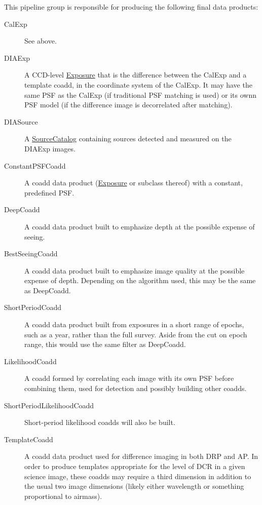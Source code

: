 This pipeline group is responsible for producing the following final data products:
\begin{description}
\item[CalExp]  See above.
\item[DIAExp] A CCD-level \hyperref[sec:spImagesExposure]{Exposure} that is the difference between the CalExp and a template coadd, in the coordinate system of the CalExp.  It may have the same PSF as the CalExp (if traditional PSF matching is used) or its ownn PSF model (if the difference image is decorrelated after matching).
\item[DIASource] A \hyperref[sec:spTablesSource]{SourceCatalog} containing sources detected and measured on the DIAExp images.
\item[ConstantPSFCoadd] A coadd data product (\hyperref[sec:spImagesExposure]{Exposure} or subclass thereof) with a constant, predefined PSF.
\item[DeepCoadd] A coadd data product built to emphasize depth at the possible expense of seeing.
\item[BestSeeingCoadd] A coadd data product built to emphasize image quality at the possible expense of depth.  Depending on the algorithm used, this may be the same as DeepCoadd.
\item[ShortPeriodCoadd] A coadd data product built from exposures in a short range of epochs, such as a year, rather than the full survey.  Aside from the cut on epoch range, this would use the same filter as DeepCoadd.
\item[LikelihoodCoadd] A coadd formed by correlating each image with its own PSF before combining them, used for detection and possibly building other coadds.
\item[ShortPeriodLikelihoodCoadd] Short-period likelihood coadds will also be built.
\item[TemplateCoadd] A coadd data product used for difference imaging in both DRP and AP.  In order to produce templates appropriate for the level of DCR in a given science image, these coadds may require a third dimension in addition to the usual two image dimensions (likely either wavelength or something proportional to airmass).
\end{description}

